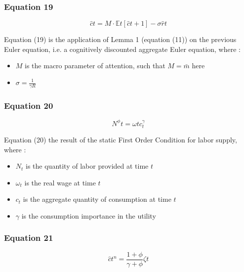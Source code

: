 \documentclass{article}
\begin{document}
\subsubsection*{Equation 19}
\begin{equation}
    \hat{c}{t}=M\cdot\mathbb{E}{t}\left[\hat{c}{t+1}\right]-\sigma\hat{r}{t}
\end{equation}

Equation (19) is the application of Lemma 1 (equation (11)) on the previous Euler equation, i.e. a cognitively discounted aggregate Euler equation, where : 
\begin{itemize}
    \item $M$ is the macro parameter of attention, such that $M=\bar{m}$ here
    \item $\sigma=\frac{1}{\gamma R}$
\end{itemize}

\subsubsection*{Equation 20}
\begin{equation}
    N^{\phi}{t}=\omega{t}c_{t}^{\gamma}
\end{equation}

Equation (20) the result of the static First Order Condition for labor supply, where : 
\begin{itemize}
    \item $N_{t}$ is the quantity of labor provided at time $t$
    \item $\omega_{t}$ is the real wage at time $t$
    \item $c_{t}$ is the aggregate quantity of consumption at time $t$
    \item $\gamma$ is the consumption importance in the utility
\end{itemize}

\subsubsection*{Equation 21}
\begin{equation}
    \hat{c}{t}^{n}=\frac{1+\phi}{\gamma+\phi}\zeta{t}
\end{equation}
\end{document}
